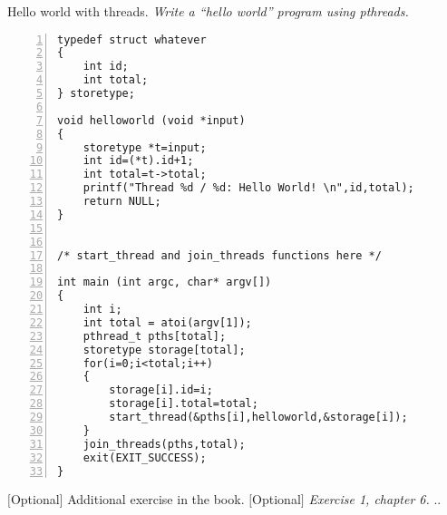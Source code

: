 \documentclass{article}
\begin{document}
\begin{ExerciseList}
\Exercise Hello world with threads.
\newpage
\Question \emph{Write a ``hello world'' program using pthreads.} 

\begin{lstlisting}[basicstyle=\small\sffamily,
keywords={break,case,const,continue,default,else,enum,
for,if,return,switch,while,do,long,void,int,float,double,
char,struct,typedef,include,size\_t},
keywordstyle={\color{blue}},
comment={[l]{//}}, morecomment={[s]{/*}{*/}}, commentstyle=\itshape,
columns={[l]flexible}, numbers=left, numberstyle=\tiny,
frameround=fftt, frame=shadowbox, captionpos=b,
caption={Hello world with pthreads.},
label=LST:hello]
typedef struct whatever
{
	int id;
	int total;
} storetype;

void helloworld (void *input)
{
	storetype *t=input;
	int id=(*t).id+1;
	int total=t->total;
	printf("Thread %d / %d: Hello World! \n",id,total);
	return NULL;
}


/* start_thread and join_threads functions here */

int main (int argc, char* argv[])
{
	int i;
	int total = atoi(argv[1]);
	pthread_t pths[total];
	storetype storage[total];
	for(i=0;i<total;i++)
	{
		storage[i].id=i;
		storage[i].total=total;
		start_thread(&pths[i],helloworld,&storage[i]);
	}
	join_threads(pths,total);
	exit(EXIT_SUCCESS);
}
\end{lstlisting}


\Exercise $[$Optional$]$ Additional exercise in the book.
\Question $[$Optional$]$ \emph{Exercise 1, chapter 6.}
\Answer .. %

\end{ExerciseList}
\newpage
\end{document}
